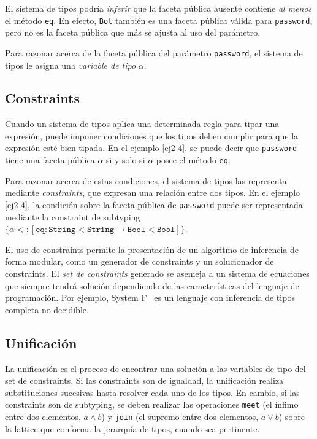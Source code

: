 El sistema de tipos podría \emph{inferir} que la faceta pública ausente contiene \emph{al menos} el método \texttt{eq}. En efecto, \texttt{Bot} también es una faceta pública válida para \texttt{password}, pero no es la faceta pública que más se ajusta al uso del parámetro.

Para razonar acerca de la faceta pública del parámetro \texttt{password}, el sistema de tipos le asigna una \emph{variable de tipo} $\alpha$.

\subsection{Constraints} \label{constraints}
Cuando un sistema de tipos aplica una determinada regla para tipar una expresión, puede imponer condiciones que los tipos deben cumplir para que la expresión esté bien tipada. En el ejemplo \ref{ej2-4}, se puede decir que \texttt{password} tiene una faceta pública $\mathtt{\alpha}$ si y solo si $\mathtt{\alpha}$ posee el método \texttt{eq}.

Para razonar acerca de estas condiciones, el sistema de tipos las representa mediante \emph{constraints}, que expresan una relación entre dos tipos. En el ejemplo \ref{ej2-4}, la condición sobre la faceta pública de \texttt{password} puede ser representada mediante la constraint de subtyping $\{\alpha <: [\mathtt{eq} : \mathtt{String<String} \rightarrow \mathtt{Bool<Bool}]\}$.

El uso de constraints permite la presentación de un algoritmo de inferencia de forma modular, como un generador de constraints y un solucionador de constraints. El \emph{set de constraints} generado se asemeja a un sistema de ecuaciones que siempre tendrá solución dependiendo de las características del lenguaje de programación. Por ejemplo, System F~\cite{WELLS1999111} es un lenguaje con inferencia de tipos completa no decidible.

\subsection{Unificación}
La unificación es el proceso de encontrar una solución a las variables de tipo del set de constraints. Si las constraints son de igualdad, la unificación realiza substituciones sucesivas hasta resolver cada uno de los tipos. En cambio, si las constraints son de subtyping, se deben realizar las operaciones \texttt{meet} (el ínfimo entre dos elementos, $a \wedge b$) y \texttt{join} (el supremo entre dos elementos, $a \vee b$) sobre la lattice que conforma la jerarquía de tipos, cuando sea pertinente.

